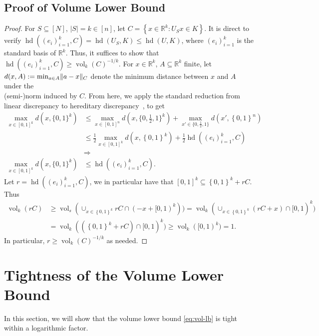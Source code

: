\documentclass[11pt]{article}
\newcommand{\R}{{\mathbb{R}}}
\newcommand{\set}[1]{\left\{ #1 \right\}}
\DeclareMathOperator{\hd}{hd}
\DeclareMathOperator{\vol}{vol}
\DeclarePairedDelimiter\norm{\lVert}{\rVert}
\begin{document}
\subsection{Proof of Volume Lower Bound}
\label{sec:proof-vollb}

\vollbstat*
\begin{proof}
For $S \subseteq [N]$, $|S| = k \in [n]$, let $C = \set{x \in \R^k: U_S x \in
K}$. It is direct to verify $\hd((e_i)_{i=1}^k,C) = \hd(U_S,K) \leq \hd(U,K)$,
where $(e_i)_{i=1}^k$ is the standard basis of $\R^k$. Thus, it suffices to
show that $\hd((e_i)_{i=1}^k,C) \geq \vol_k(C)^{-1/k}$. For $x \in \R^k$, $A
\subseteq \R^k$ finite, let $d(x,A) := \min_{a \in A} \norm{a-x}_C$
denote the minimum distance between $x$ and $A$ under the \\ (semi-)norm induced by
$C$. From here, we apply the standard reduction from linear discrepancy to
hereditary discrepancy~\cite{LSV}, to get
\begin{align*}
\max_{x \in [0,1]^k} d(x,\{0,1\}^k) &\leq \max_{x \in [0,1]^n}
d(x,\{0,\tfrac12,1\}^k) + \max_{x' \in \{0,\tfrac12,1\}} d(x',\set{0,1}^n) \\
&\leq \frac{1}{2} \max_{x \in [0,1]^k} d(x,\set{0,1}^k) + \frac{1}{2}
\hd((e_i)_{i=1}^k,C) \\
&\Rightarrow \\
\max_{x \in [0,1]^k} d(x,\{0,1\}^k) &\leq \hd((e_i)_{i=1}^k,C).
\end{align*}
Let $r = \hd((e_i)_{i=1}^k,C)$, we in particular have that $[0,1]^k \subseteq
\set{0,1}^k + rC$. Thus
\begin{align*}
\vol_k(rC) &\geq \vol_s(\cup_{x \in \set{0,1}^k} rC \cap (-x+[0,1)^k)) 
             = \vol_k(\cup_{x \in \set{0,1}^k} (rC+x) \cap [0,1)^k) \\
             &= \vol_k((\set{0,1}^k+rC) \cap [0,1)^k) 
              \geq \vol_k([0,1)^k) = 1 .
\end{align*}
In particular, $r \geq \vol_k(C)^{-1/k}$ as needed.
\end{proof}

\section{Tightness of the Volume Lower Bound}
\label{sec:tightness}

In this section, we will show that the volume lower bound \eqref{eq:vol-lb} is
tight within a logarithmic factor. 
\end{document}
